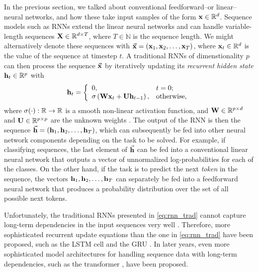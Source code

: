 \documentclass{statsmsc}
\begin{document}
{In the previous section, we talked about conventional feedforward--or linear--neural networks,
and how these take input samples of the form $\mathbf{x} \in \mathbb{R}^d$. Sequence models such as
\acfp{RNN} extend the linear neural networks and can handle variable-length sequences
$\mathbf{X} \in \mathbb{R}^{d \times T}$, where $T \in \mathbb{N}$ is the sequence length. We might alternatively
denote these sequences with $\vec{\mathbf{x}}=(\mathbf{x}_1,\mathbf{x}_2,\dots,\mathbf{x}_T)$, where $\mathbf{x}_t\in\mathbb{R}^d$ is the
value of the sequence at timestep $t$.
A traditional \acp{RNN} of dimenstionality $p$ can then process the sequence $\vec{\mathbf{x}}$ by
iteratively updating its \textit{recurrent hidden state} $\mathbf{h}_t \in
\mathbb{R}^{p}$ with
\begin{equation}\label{eq:rnn_trad}
    \mathbf{h}_t=
    \left\{
        \begin{array}{ll}
            0, & t=0; \\
            \sigma\left(\mathbf{W}\mathbf{x}_t + \mathbf{U}\mathbf{h}_{t-1} \right), & \textrm{otherwise,}
        \end{array}
    \right.
\end{equation}
where $\sigma(\cdot): \mathbb{R} \rightarrow {\mathbb{R}}$ is a smooth non-linear activation function,
and $\mathbf{W} \in \mathbb{R}^{p \times d}$ and $\mathbf{U} \in \mathbb{R}^{p \times p}$ are the unknown
weights \citep{gru}.
The output of the \ac{RNN} is then the sequence
$\vec{\mathbf{h}}=\left(\mathbf{h}_1,\mathbf{h}_2,\dots,\mathbf{h}_T \right)$, which can subsequently be fed into other
neural network components depending on the task to be solved. For example, if
classifying sequences, the last element of $\vec{\mathbf{h}}$ can be fed into a conventional
linear neural network that outputs a vector of unnormalized log-probabilities for each of
the classes. On the other hand, if the task is to predict the next \textit{token} in the
sequence, the vectors $\mathbf{h}_1,\mathbf{h}_2,\dots,\mathbf{h}_T$ can separately be fed into a feedforward
neural network that produces a probability distribution over the set of all possible next tokens.

Unfortunately, the traditional \acp{RNN} presented in \cref{eq:rnn_trad} cannot
capture long-term dependencies in the input sequences very well
\citep{long_term_dep}. Therefore, more sophisticated recurrent update equations
than the one in \cref{eq:rnn_trad} have been proposed, such as the \ac{LSTM}
cell \citep{lstm} and the \ac{GRU} \citep{gru_cho}.
In later years, even more sophisticated model architectures for handling sequence data with
long-term dependencies, such as the transformer \citep{attention}, have been proposed.

}
\end{document}

